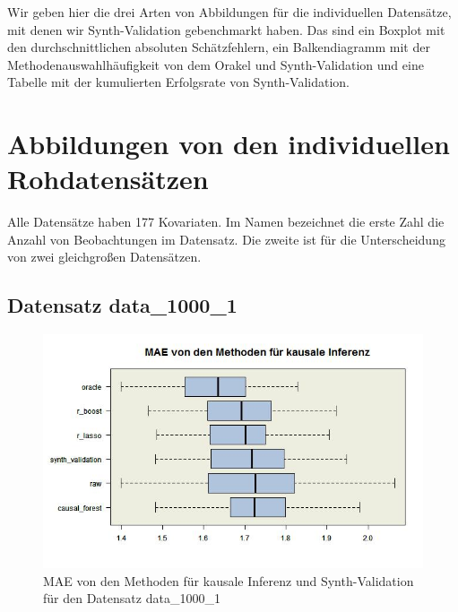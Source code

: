 \documentclass[12pt,a4paper,twoside]{scrartcl}
\numberwithin{equation}{section}
\newcounter{mypagecount}%
\newenvironment{interlude}{%
  \clearpage
  \setcounter{mypagecount}{\value{page}}%
  \thispagestyle{empty}%
  \pagestyle{empty}%
}{%
  \clearpage
  \setcounter{page}{\value{mypagecount}}%
}
\let\chapter=\section %
\begin{document}
\begin{interlude}
  
\begin{appendices}
  \label{anhang}
\noindent 
Wir geben hier die drei Arten von Abbildungen für die individuellen Datensätze, mit denen wir Synth-Validation gebenchmarkt haben. Das sind ein Boxplot mit den durchschnittlichen absoluten Schätzfehlern, ein Balkendiagramm mit der Methodenauswahlhäufigkeit von dem Orakel und Synth-Validation und eine Tabelle mit der kumulierten Erfolgsrate von Synth-Validation.\par

\chapter{Abbildungen von den individuellen Rohdatensätzen}\label{app:a}
\noindent 
Alle Datensätze haben 177 Kovariaten. Im Namen bezeichnet die erste Zahl die Anzahl von Beobachtungen im Datensatz. Die zweite ist für die Unterscheidung von zwei gleichgroßen Datensätzen.\par

\subsection{Datensatz data\_1000\_1}

\begin{center}
\begin{figure}[H]
    \centering
    \includegraphics[height=0.5\textwidth, width=1\textwidth]{figures/plots/appendix/rawData1000aBoxplot.jpeg}
    \caption[MAE von den Methoden für kausale Inferenz und Synth-Validation für den Datensatz data\_1000\_1]{MAE von den Methoden für kausale Inferenz und Synth-Validation für den Datensatz data\_1000\_1}
  \end{figure}
\end{center}


\end{appendices}
\end{interlude}
\end{document}

